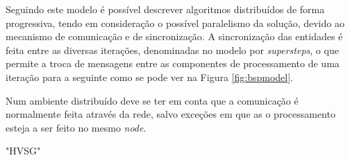 Seguindo este modelo é possível descrever algoritmos distribuídos de forma 
progressiva, tendo em consideração o possível paralelismo da solução, devido ao 
mecanismo de comunicação e de sincronização. A sincronização das entidades é  
feita entre as diversas iterações, denominadas no modelo por 
\textit{supersteps}, o que permite a troca de mensagens entre as componentes de 
processamento de uma iteração para a seguinte como se pode ver na Figura 
\ref{fig:bspmodel}.

Num ambiente distribuído deve se ter em conta que a comunicação é normalmente 
feita através da rede, salvo exceções em que as o processamento esteja a ser 
feito no mesmo \textit{node}.

{"HVSG"}